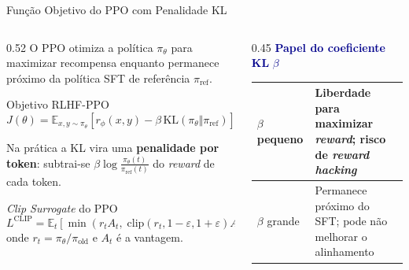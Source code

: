 \documentclass[aspectratio=169, xcolor=dvipsnames]{beamer}
\begin{document}
  \begin{frame}{Função Objetivo do PPO com Penalidade KL \cite{schulman2017ppo}}
    \small
    \begin{columns}
      \begin{column}{0.52\textwidth}
        O PPO otimiza a política $\pi_\theta$ para maximizar recompensa
        enquanto permanece próximo da política SFT de referência $\pi_{\text{ref}}$.

        \begin{block}{Objetivo RLHF-PPO}
          \[
            J(\theta) = \mathbb{E}_{x,y\sim\pi_\theta}\!\left[
              r_\phi(x,y) - \beta\, \text{KL}\!\left(\pi_\theta \Vert \pi_{\text{ref}}\right)
            \right]
          \]
        \end{block}
        \vspace{-0.2em}
        {\scriptsize\textcolor{MidGray}{Na prática a KL vira uma \textbf{penalidade por token}: subtrai-se $\beta\log\frac{\pi_\theta(t)}{\pi_{\text{ref}}(t)}$ do \textit{reward} de cada token.}}

        \begin{block}{\textit{Clip Surrogate} do PPO}
          \[
            L^{\text{CLIP}} = \mathbb{E}_t\!\left[
              \min\!\left(r_t A_t,\;
              \text{clip}(r_t, 1{-}\varepsilon, 1{+}\varepsilon) A_t
              \right)
            \right]
          \]
          onde $r_t = \pi_\theta / \pi_{\text{old}}$ e $A_t$ é a vantagem.
        \end{block}
      \end{column}
      \begin{column}{0.45\textwidth}
        \textcolor{DarkBlue}{\textbf{Papel do coeficiente KL} $\beta$}
        \vspace{0.1em}

        \begin{tabular}{@{}l>{\raggedright\arraybackslash}p{4.2cm}@{}}
          \toprule
          $\beta$ pequeno & Liberdade para maximizar \textit{reward}; risco de \textit{reward hacking} \\
          \midrule
          $\beta$ grande  & Permanece próximo do SFT; pode não melhorar o alinhamento \\
          \bottomrule
        \end{tabular}


\end{column}
\end{columns}
\end{frame}
\end{document}
